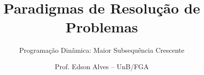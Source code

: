 \title{Paradigmas de Resolução de Problemas}
\subtitle{Programação Dinâmica: Maior Subsequência Crescente}
\author{Prof. Edson Alves -- UnB/FGA}
\date{}
